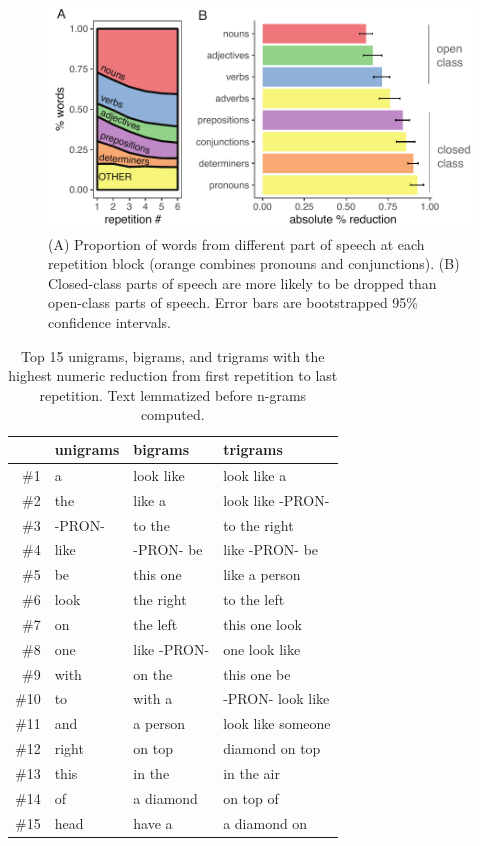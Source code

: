 \documentclass[alpha-refs]{wiley-article}
\begin{document}

\begin{figure}[t!]
\centering
\includegraphics[scale=.8]{posResults.pdf}
\caption{(A) Proportion of words from different part of speech at each repetition block (orange combines pronouns and conjunctions). (B) Closed-class parts of speech are more likely to be dropped than open-class parts of speech. Error bars are bootstrapped 95\% confidence intervals.} 
\label{fig:pos}
\end{figure}

\begin{table}[t]
\centering
\begin{tabular}{|r||l|l|l|}
  \hline
 & unigrams & bigrams & trigrams \\ 
  \hline
\#1 & a & look like & look like a \\ 
  \#2 & the & like a & look like -PRON- \\ 
  \#3 & -PRON- & to the & to the right \\ 
  \#4 & like & -PRON- be & like -PRON- be \\ 
  \#5 & be & this one & like a person \\ 
  \#6 & look & the right & to the left \\ 
  \#7 & on & the left & this one look \\ 
  \#8 & one & like -PRON- & one look like \\ 
  \#9 & with & on the & this one be \\ 
  \#10 & to & with a & -PRON- look like \\ 
  \#11 & and & a person & look like someone \\ 
  \#12 & right & on top & diamond on top \\ 
  \#13 & this & in the & in the air \\ 
  \#14 & of & a diamond & on top of \\ 
  \#15 & head & have a & a diamond on \\ 
   \hline
\end{tabular}
\caption{Top 15 unigrams, bigrams, and trigrams with the highest numeric reduction from first repetition to last repetition. Text lemmatized before n-grams computed. } 
\label{tab:words}
\end{table}
\end{document}
